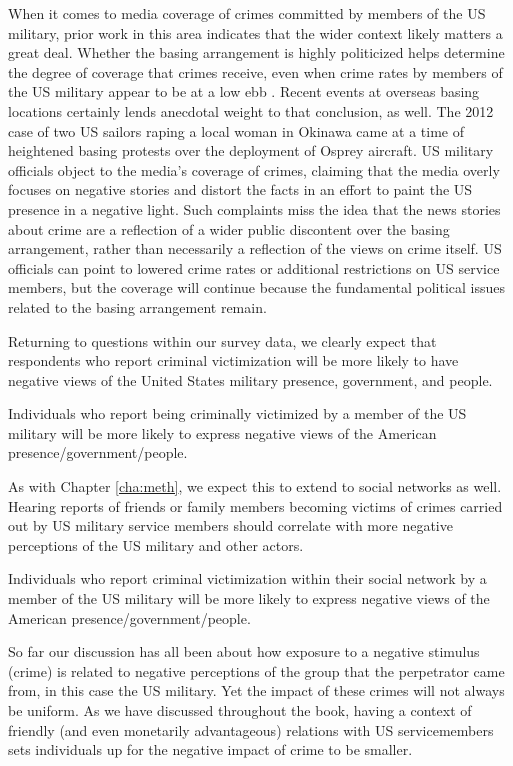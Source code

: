 When it comes to media coverage of crimes committed by members of the US military, prior work in this area indicates that the wider context likely matters a great deal. Whether the basing arrangement is highly politicized helps determine the degree of coverage that crimes receive, even when crime rates by members of the US military appear to be at a low ebb \cite[p.123]{Cooley2008}. Recent events at overseas basing locations certainly lends anecdotal weight to that conclusion, as well. The 2012 case of two US sailors raping a local woman in Okinawa came at a time of heightened basing protests over the deployment of Osprey aircraft\cite{McCurry10172012, USAToday312013}. US military officials object to the media's coverage of crimes, claiming that the media overly focuses on negative stories and distort the facts in an effort to paint the US presence in a negative light. Such complaints miss the idea that the news stories about crime are a reflection of a wider public discontent over the basing arrangement, rather than necessarily a reflection of the views on crime itself. US officials can point to lowered crime rates or additional restrictions on US service members, but the coverage will continue because the fundamental political issues related to the basing arrangement remain.

Returning to questions within our survey data, we clearly expect that respondents who report criminal victimization will be more likely to have negative views of the United States military presence, government, and people. 

\begin{hyp}
	Individuals who report being criminally victimized by a member of the US military will be more likely to express negative views of the American presence/government/people. 
\end{hyp}

As with Chapter \ref{cha:meth}, we expect this to extend to social networks as well. Hearing reports of friends or family members becoming victims of crimes carried out by US military service members should correlate with more negative perceptions of the US military and other actors. 

\begin{hyp}
	Individuals who report criminal victimization within their social network by a member of the US military will be more likely to express negative views of the American presence/government/people. 
\end{hyp}

So far our discussion has all been about how exposure to a negative stimulus (crime) is related to negative perceptions of the group that the perpetrator came from, in this case the US military. Yet the impact of these crimes will not always be uniform. As we have discussed throughout the book, having a context of friendly (and even monetarily advantageous) relations with US servicemembers sets individuals up for the negative impact of crime to be smaller. 

